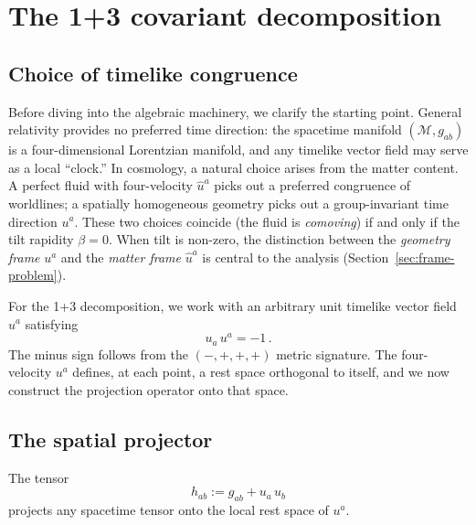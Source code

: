 \section{The 1+3 covariant decomposition}\label{sec:13cov}

\subsection{Choice of timelike congruence}\label{sec:congruence}

Before diving into the algebraic machinery, we clarify the
starting point.  General relativity provides no preferred time
direction: the spacetime manifold $(\mathcal{M}, g_{ab})$ is a
four-dimensional Lorentzian manifold, and any timelike vector
field may serve as a local ``clock.''  In cosmology, a natural
choice arises from the matter content.  A perfect fluid with
four-velocity $\hat{u}^a$ picks out a preferred congruence of
worldlines; a spatially homogeneous geometry picks out a
group-invariant time direction $u^a$.  These two choices coincide
(the fluid is \emph{comoving}) if and only if the tilt rapidity
$\beta = 0$.  When tilt is non-zero, the distinction between the
\emph{geometry frame} $u^a$ and the \emph{matter frame}
$\hat{u}^a$ is central to the analysis
(Section~\ref{sec:frame-problem}).

For the 1+3 decomposition, we work with an arbitrary unit
timelike vector field $u^a$ satisfying
\begin{equation}\label{eq:u-norm}
u_a\, u^a = -1\,.
\end{equation}
The minus sign follows from the $(-,+,+,+)$ metric signature.
The four-velocity $u^a$ defines, at each point, a rest space
orthogonal to itself, and we now construct the projection
operator onto that space.


\subsection{The spatial projector}\label{sec:projector}

\begin{definition}\label{def:hab}
The tensor
\begin{equation}\label{eq:hab-def}
h_{ab} := g_{ab} + u_a\, u_b
\end{equation}
projects any spacetime tensor onto the local rest space of $u^a$.
\end{definition}

